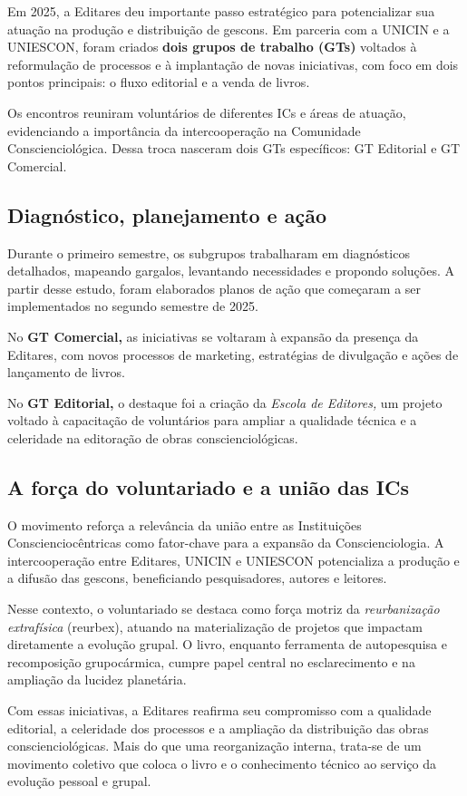 \documentclass{gescons}
\begin{document}
    
    \begin{multicols}{2}



Em 2025, a Editares deu importante passo estratégico para potencializar sua atuação na produção e distribuição de gescons. Em parceria com a UNICIN e a UNIESCON, foram criados \textbf{dois grupos de trabalho (GTs)} voltados à reformulação de processos e à implantação de novas iniciativas, com foco em dois pontos principais: o fluxo editorial e a venda de livros.

Os encontros reuniram voluntários de diferentes ICs e áreas de atuação, evidenciando a importância da intercooperação na Comunidade Conscienciológica. Dessa troca nasceram dois GTs específicos: GT Editorial e GT Comercial.

\subsection*{Diagnóstico, planejamento e ação}

Durante o primeiro semestre, os subgrupos trabalharam em diagnósticos detalhados, mapeando gargalos, levantando necessidades e propondo soluções. A partir desse estudo, foram elaborados planos de ação que começaram a ser implementados no segundo semestre de 2025.

No \textbf{GT Comercial,} as iniciativas se voltaram à expansão da presença da Editares, com novos processos de marketing, estratégias de divulgação e ações de lançamento de livros. 

No \textbf{GT Editorial,} o destaque foi a criação da \emph{Escola de Editores,} um projeto voltado à capacitação de voluntários para ampliar a qualidade técnica e a celeridade na editoração de obras conscienciológicas.

\subsection*{A força do voluntariado e a união das ICs}

O movimento reforça a relevância da união entre as Instituições Conscienciocêntricas como fator-chave para a expansão da Conscienciologia. A intercooperação entre Editares, UNICIN e UNIESCON potencializa a produção e a difusão das gescons, beneficiando pesquisadores, autores e leitores.

Nesse contexto, o voluntariado se destaca como força motriz da \emph{reurbanização extrafísica} (reurbex), atuando na materialização de projetos que impactam diretamente a evolução grupal. O livro, enquanto ferramenta de autopesquisa e recomposição grupocármica, cumpre papel central no esclarecimento e na ampliação da lucidez planetária.

Com essas iniciativas, a Editares reafirma seu compromisso com a qualidade editorial, a celeridade dos processos e a ampliação da distribuição das obras conscienciológicas. Mais do que uma reorganização interna, trata-se de um movimento coletivo que coloca o livro e o conhecimento técnico ao serviço da evolução pessoal e grupal.





    \end{multicols}
\end{document}
